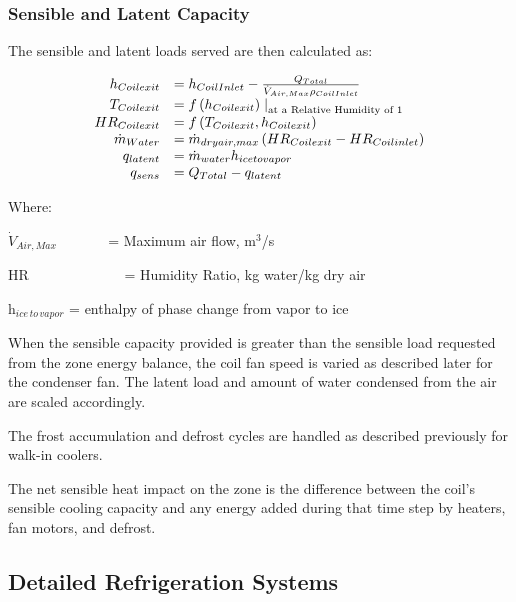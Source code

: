 \subsubsection{Sensible and Latent Capacity}\label{sensible-and-latent-capacity}

The sensible and latent loads served are then calculated as:

\begin{equation}
  \begin{array}{rl}
      h_{Coil exit} &= h_{Coil Inlet} - \frac{Q_{Total}}{\dot{V}_{Air,Max} \rho_{Coil Inlet}} \\
      T_{Coil exit} &= f\PB{h_{Coil exit}}\left.\right|_{\text{at a Relative Humidity of 1}} \\
     HR_{Coil exit} &= f\PB{T_{Coil exit},h_{Coil exit}} \\
    \dot{m}_{Water} &= \dot{m}_{dryair,max} \PB{HR_{Coil exit} - HR_{Coil inlet}} \\
         q_{latent} &= \dot{m}_{water} h_{icetovapor} \\
           q_{sens} &= Q_{Total} - q_{latent}
  \end{array}
\end{equation}

Where:

\({\dot V_{Air,Max}}\) ~~~~~~ = Maximum air flow, m\(^{3}\)/s

HR~~~~~~~~~~~~~ = Humidity Ratio, kg water/kg dry air

h\(_{ice\, to\, vapor}\) = enthalpy of phase change from vapor to ice

When the sensible capacity provided is greater than the sensible load requested from the zone energy balance, the coil fan speed is varied as described later for the condenser fan. The latent load and amount of water condensed from the air are scaled accordingly.

The frost accumulation and defrost cycles are handled as described previously for walk-in coolers.

The net sensible heat impact on the zone is the difference between the coil's sensible cooling capacity and any energy added during that time step by heaters, fan motors, and defrost.

\subsection{Detailed Refrigeration Systems}\label{detailed-refrigeration-systems}

